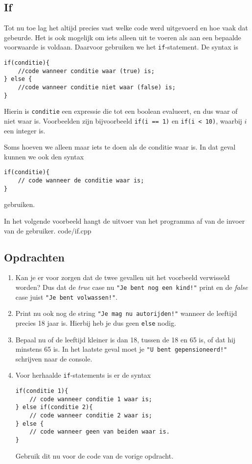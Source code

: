 \documentclass[12pt,a4paper]{article}
\newcommand{\code}{}
\newcommand{\icode}{\lstinline}
\begin{document}
\subsection{If}
Tot nu toe lag het altijd precies vast welke code werd uitgevoerd en hoe vaak dat gebeurde. Het is ook mogelijk om iets alleen uit te voeren als aan een bepaalde voorwaarde is voldaan. Daarvoor gebruiken we het \icode{if}-statement. De syntax is
\begin{lstlisting}
if(conditie){
	//code wanneer conditie waar (true) is;
} else {
	//code wanneer conditie niet waar (false) is;
}
\end{lstlisting}
Hierin is \icode{conditie} een expressie die tot een boolean evalueert, en dus waar of niet waar is. Voorbeelden zijn bijvoorbeeld \icode{if(i == 1)} en \icode{if(i < 10)}, waarbij $i$ een integer is.

Soms hoeven we alleen maar iets te doen als de conditie waar is. In dat geval kunnen we ook den syntax
\begin{lstlisting}
if(conditie){
	// code wanneer de conditie waar is;
}
\end{lstlisting}
gebruiken.

In het volgende voorbeeld hangt de uitvoer van het programma af van de invoer van de gebruiker.
\code{code/if.cpp}

\subsection{Opdrachten}
\begin{enumerate}
		\item
		Kan je er voor zorgen dat de twee gevallen uit het voorbeeld verwisseld worden? Dus dat de \emph{true} case nu \icode{"Je bent nog een kind!"} print en de \emph{false} case juist \icode{"Je bent volwassen!"}.
		\item
			Print nu ook nog de string \icode{"Je mag nu autorijden!"} wanneer de leeftijd precies 18 jaar is. Hierbij heb je dus geen \icode{else} nodig.
		\item
			Bepaal nu of de leeftijd kleiner is dan 18, tussen de 18 en 65 is, of dat hij minstens 65 is. In het laatste geval moet je \icode{"U bent gepensioneerd!"} schrijven naar de console.
		\item
			Voor herhaalde \icode{if}-statements is er de syntax
\begin{lstlisting}
if(conditie 1){
	// code wanneer conditie 1 waar is;
} else if(conditie 2){
	// code wanneer conditie 2 waar is;
} else {
	// code wanneer geen van beiden waar is.
}
\end{lstlisting}
Gebruik dit nu voor de code van de vorige opdracht.
\end{enumerate}
\end{document}
